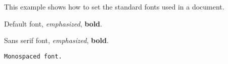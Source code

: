 \documentclass[a4paper]{article}
\begin{document}
This example shows how to set the standard fonts used in a document.

Default font, \emph{emphasized}, \textbf{bold}.

\textsf{Sans serif font, \emph{emphasized}, \textbf{bold}.}

\texttt{Monospaced font.}
\end{document}
